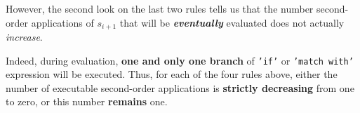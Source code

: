 	However, the second look on the last two rules tells us that the number second-order applications of $s_{i+1}$ that will be \textit{\textbf{eventually}} evaluated does not actually \textit{increase}.
	
	Indeed, during evaluation, \textbf{one and only one branch} of \texttt{'if'} or \texttt{'match with'} expression will be executed.
	Thus, for each of the four rules above, either the number of executable second-order applications is \textbf{strictly decreasing} from one to zero, or this number \textbf{remains} one. 


%

%
%	
% 	
% 	
% 	


